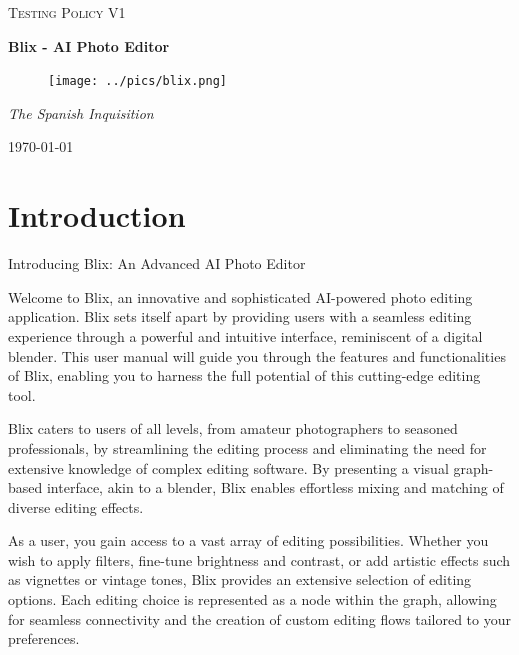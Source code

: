 \documentclass[11pt,a4paper]{article}
\begin{document}
\begin{titlepage}
	\centering
    {\scshape\LARGE Testing Policy V1\par}
    \vspace{1.5cm}
    {\huge\bfseries Blix - AI Photo Editor\par}
    \vspace{2.5cm}
    \begin{figure}[h]
        \centering %
        \texttt{[image: ../pics/blix.png]}
    \end{figure}
    \vspace{2.5cm}
    {\Large\itshape The Spanish Inquisition\par}

    \vfill
    {\large \today\par}
\end{titlepage}

\tableofcontents
\pagebreak


\section*{Introduction}

Introducing Blix: An Advanced AI Photo Editor

Welcome to Blix, an innovative and sophisticated AI-powered photo editing application. Blix sets itself apart by providing users with a seamless editing experience through a powerful and 
intuitive interface, reminiscent of a digital blender. This user manual will guide you through the features and functionalities of Blix, enabling you to harness the full potential of 
this cutting-edge editing tool.

Blix caters to users of all levels, from amateur photographers to seasoned professionals, by streamlining the editing process and eliminating the need 
for extensive knowledge of complex editing software. By presenting a visual graph-based interface, akin to a blender, Blix enables effortless mixing and matching of diverse editing effects.

As a user, you gain access to a vast array of editing possibilities. Whether you wish to apply filters, fine-tune brightness and contrast, or add artistic effects such as vignettes or vintage tones, Blix provides an extensive selection of editing options. Each editing choice is represented as a node within the graph, allowing for seamless connectivity and the creation of custom editing flows tailored to your preferences.
\end{document}
